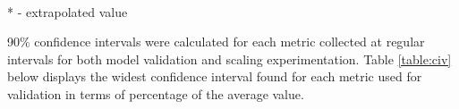 \documentclass[12pt]{report}
\begin{document}
\begin{comment}
\begin{center}
\captionof{table}{Blockchain Size (GB) for Varying Configurations and Dates}
\begin{tabularx}{\textwidth}{XXXXX}
 \hline
  -- & Default & Bitcoin Cash & Segwit2x & Litecoin \\ 
 \hline
 7/31/17 & 126.7 & 126.7 & 126.7 & 126.7 \\ 
 \hline
 11/29/17 & 144.6 & 147.0 & 144.8 & 144.2 \\
 \hline
 3/31/18 & 165.5 & 170.4 & 166.5 & 164.4 \\
 \hline
 6/30/18 & 181.8 & 190.3 & 184.7 & 181.6 \\
 \hline
 11/29/18 & 209.1* & 228.6 & 219.6 & 214.6 \\
 \hline
 3/31/19 & 230.9* & 264.5 & 252.4 & 245.7 \\
 \hline
 6/30/19 & 247.3* & 295.2 & 280.2 & 272.2 \\
 \hline
\label{table:result2}
\end{tabularx}
* - extrapolated value
\end{center}
\end{comment}

\begin{table}[]
\centering
\caption{Blockchain Size (GB) for Varying Configurations and Dates}
\label{table:result2}
\\ * - extrapolated value
\end{table}

90\% confidence intervals were calculated for each metric collected at regular intervals for both model validation and scaling experimentation. Table \ref{table:civ} below displays the widest confidence interval found for each metric used for validation in terms of percentage of the average value.
\end{document}

